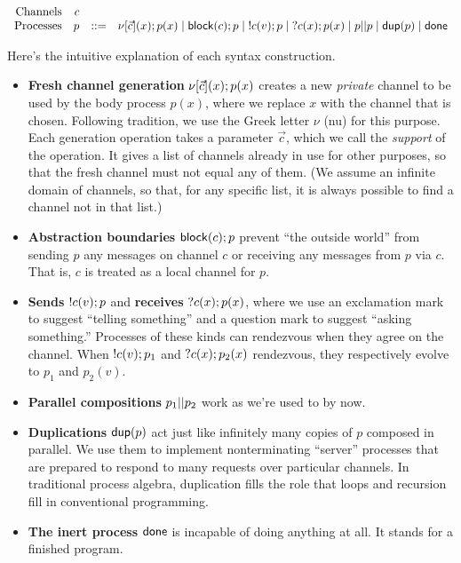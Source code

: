 \documentclass{amsbook}
\theoremstyle{definition}
\theoremstyle{remark}
\numberwithin{section}{chapter}
\numberwithin{equation}{chapter}
\begin{document}
$$\begin{array}{rrcl}
  \textrm{Channels} & c \\
  \textrm{Processes} & p &::=& \nu[\vec{c}](x); p(x) \mid \mathsf{block}(c); p \mid \; !c(v); p \mid \; ?c(x); p(x) \mid p || p \mid \mathsf{dup}(p) \mid \mathsf{done}
\end{array}$$

Here's the intuitive explanation of each syntax construction.
\begin{itemize}
  \item \textbf{Fresh channel generation} $\nu[\vec{c}](x); p(x)$ creates a new \emph{private} channel to be used by the body process $p(x)$, where we replace $x$ with the channel that is chosen.  Following tradition, we use the Greek letter $\nu$\index{$\nu$} (nu) for this purpose.  Each generation operation takes a parameter $\vec{c}$, which we call the \emph{support} of the operation.  It gives a list of channels already in use for other purposes, so that the fresh channel must not equal any of them.  (We assume an infinite domain of channels, so that, for any specific list, it is always possible to find a channel not in that list.)

  \item \textbf{Abstraction boundaries} $\mathsf{block}(c); p$ prevent ``the outside world'' from sending $p$ any messages on channel $c$ or receiving any messages from $p$ via $c$.  That is, $c$ is treated as a local channel for $p$.
\abstraction

  \item \textbf{Sends} $!c(v); p$ and \textbf{receives} $?c(x); p(x)$, where we use an exclamation mark to suggest ``telling something'' and a question mark to suggest ``asking something.''  Processes of these kinds can rendezvous when they agree on the channel.  When $!c(v); p_1$ and $?c(x); p_2(x)$ rendezvous, they respectively evolve to $p_1$ and $p_2(v)$.

  \item \textbf{Parallel compositions} $p_1 || p_2$ work as we're used to by now.

  \item \textbf{Duplications} $\mathsf{dup}(p)$ act just like infinitely many copies of $p$ composed in parallel.  We use them to implement nonterminating ``server'' processes that are prepared to respond to many requests over particular channels.  In traditional process algebra, duplication fills the role that loops and recursion fill in conventional programming.

  \item \textbf{The inert process} $\mathsf{done}$ is incapable of doing anything at all.  It stands for a finished program.
\end{itemize}
\end{document}
